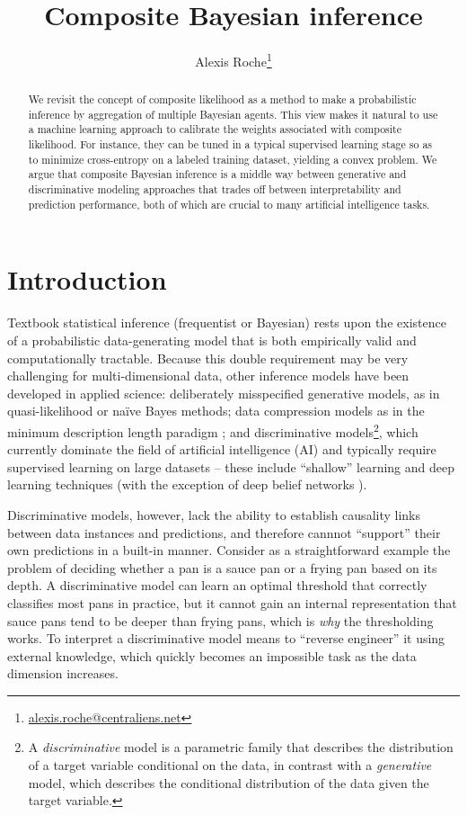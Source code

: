 \documentclass[english]{scrartcl}
\title{Composite Bayesian inference}
\date{}
\author{Alexis Roche\thanks{\url{alexis.roche@centraliens.net}}}
\begin{document}
\maketitle

\begin{abstract}
We revisit the concept of composite likelihood as a method to make a probabilistic inference by aggregation of multiple Bayesian agents. This view makes it natural to use a machine learning approach to calibrate the weights associated with composite likelihood. For instance, they can be tuned in a typical supervised learning stage so as to minimize cross-entropy on a labeled training dataset, yielding a convex problem. We argue that composite Bayesian inference is a middle way between generative and discriminative modeling approaches that trades off between interpretability and prediction performance, both of which are crucial to many artificial intelligence tasks.
\end{abstract}


\section{Introduction}
\label{sec:intro}

Textbook statistical inference (frequentist or Bayesian) rests upon the existence of a probabilistic data-generating model that is both empirically valid and computationally tractable. Because this double requirement may be very challenging for multi-dimensional data, other inference models have been developed in applied science: deliberately misspecified generative models, as in quasi-likelihood \cite{White-82,Walker-13} or na\"ive Bayes \cite{Ng-01} methods; data compression models as in the minimum description length paradigm \cite{Grunwald-07}; and discriminative models\footnote{A {\em discriminative} model is a parametric family that describes the distribution of a target variable conditional on the data, in contrast with a {\em generative} model, which describes the conditional distribution of the data given the target variable.}, which currently dominate the field of artificial intelligence (AI) and typically require supervised learning on large datasets -- these include ``shallow'' learning \cite{Ho-95,BergerA-96,Vapnik-00,Rasmussen-06} and deep learning \cite{Lecun-15,Goodfellow-16} techniques (with the exception of deep belief networks \cite{Hinton-06}).

Discriminative models, however, lack the ability to establish causality links between data instances and predictions, and therefore cannnot ``support'' their own predictions in a built-in manner. Consider as a straightforward example the problem of deciding whether a pan is a sauce pan or a frying pan based on its depth. A discriminative model can learn an optimal threshold that correctly classifies most pans in practice, but it cannot gain an internal representation that sauce pans tend to be deeper than frying pans, which is {\em why} the thresholding works. To interpret a discriminative model means to ``reverse engineer'' it using external knowledge, which quickly becomes an impossible task as the data dimension increases.
\end{document}
